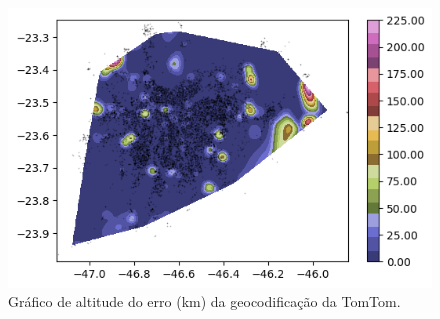 \documentclass{article}
\begin{document}
\begin{figure}[h]
  \centering
  \includegraphics[width=\textwidth]{graficoAltPontosTomtom.png}
  \caption{Gráfico de altitude do erro (km) da geocodificação da TomTom.}
  \label{fig:grafAltT}
\end{figure}

   
 



\end{document}
